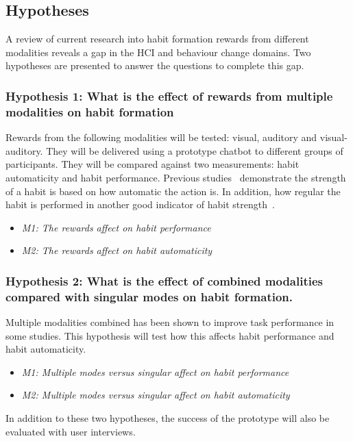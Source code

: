 
\subsection{Hypotheses} \label{hypothese}
A review of current research into habit formation rewards from different modalities reveals a gap in the HCI and behaviour change domains.
Two hypotheses are presented to answer the questions to complete this gap.

\subsubsection*{Hypothesis 1: What is the effect of rewards from multiple modalities on habit formation}
Rewards from the following modalities will be tested: visual, auditory and visual-auditory. They will be delivered using a prototype chatbot to different groups of participants. They will be compared against two measurements: habit automaticity and habit performance. Previous studies~\cite{article_habit_strength, article_4q_SRBAI} demonstrate the strength of a habit is based on how automatic the action is. In addition, how regular the habit is performed in another good indicator of habit strength~\cite{article_promoting_habit_formation, article_experiences_of_habit_formation}.

\begin{itemize}
  \item \textit{M1: The rewards affect on habit performance}
  \item \textit{M2: The rewards affect on habit automaticity}
\end{itemize}

\subsubsection*{Hypothesis 2: What is the effect of combined modalities compared with singular modes on habit formation.}
Multiple modalities combined has been shown to improve task performance in some studies. This hypothesis will test how this affects habit performance and habit automaticity.

\begin{itemize}
  \item \textit{M1: Multiple modes versus singular affect on habit performance}
  \item \textit{M2: Multiple modes versus singular affect on habit automaticity}
\end{itemize}

In addition to these two hypotheses, the success of the prototype will also be evaluated with user interviews.

